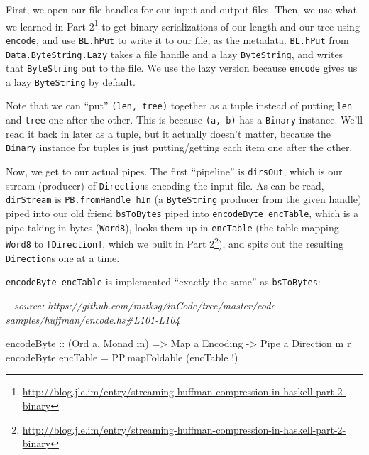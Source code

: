 \documentclass[]{article}
\newenvironment{Shaded}{}{}
\newcommand{\CommentTok}[1]{\textcolor[rgb]{0.38,0.63,0.69}{\textit{#1}}}
\newcommand{\DataTypeTok}[1]{\textcolor[rgb]{0.56,0.13,0.00}{#1}}
\newcommand{\FunctionTok}[1]{\textcolor[rgb]{0.02,0.16,0.49}{#1}}
\newcommand{\NormalTok}[1]{#1}
\newcommand{\OtherTok}[1]{\textcolor[rgb]{0.00,0.44,0.13}{#1}}
\renewcommand{\href}[2]{#2\footnote{\url{#1}}}
\begin{document}
First, we open our file handles for our input and output files. Then, we use
what we learned in
\href{http://blog.jle.im/entry/streaming-huffman-compression-in-haskell-part-2-binary}{Part
2} to get binary serializations of our length and our tree using
\texttt{encode}, and use \texttt{BL.hPut} to write it to our file, as the
metadata. \texttt{BL.hPut} from \texttt{Data.ByteString.Lazy} takes a file
handle and a lazy \texttt{ByteString}, and writes that \texttt{ByteString} out
to the file. We use the lazy version because \texttt{encode} gives us a lazy
\texttt{ByteString} by default.

Note that we can ``put'' \texttt{(len,\ tree)} together as a tuple instead of
putting \texttt{len} and \texttt{tree} one after the other. This is because
\texttt{(a,\ b)} has a \texttt{Binary} instance. We'll read it back in later as
a tuple, but it actually doesn't matter, because the \texttt{Binary} instance
for tuples is just putting/getting each item one after the other.

Now, we get to our actual pipes. The first ``pipeline'' is \texttt{dirsOut},
which is our stream (producer) of \texttt{Direction}s encoding the input file.
As can be read, \texttt{dirStream} is \texttt{PB.fromHandle\ hIn} (a
\texttt{ByteString} producer from the given handle) piped into our old friend
\texttt{bsToBytes} piped into \texttt{encodeByte\ encTable}, which is a pipe
taking in bytes (\texttt{Word8}), looks them up in \texttt{encTable} (the table
mapping \texttt{Word8} to \texttt{{[}Direction{]}}, which we built in
\href{http://blog.jle.im/entry/streaming-huffman-compression-in-haskell-part-2-binary}{Part
2}), and spits out the resulting \texttt{Direction}s one at a time.

\texttt{encodeByte\ encTable} is implemented ``exactly the same'' as
\texttt{bsToBytes}:

\begin{Shaded}
\begin{Highlighting}[]
\CommentTok{-- source: https://github.com/mstksg/inCode/tree/master/code-samples/huffman/encode.hs#L101-L104}

\OtherTok{encodeByte ::}\NormalTok{ (}\DataTypeTok{Ord}\NormalTok{ a, }\DataTypeTok{Monad}\NormalTok{ m)}
           \OtherTok{=>} \DataTypeTok{Map}\NormalTok{ a }\DataTypeTok{Encoding}
           \OtherTok{->} \DataTypeTok{Pipe}\NormalTok{ a }\DataTypeTok{Direction}\NormalTok{ m r}
\NormalTok{encodeByte encTable }\FunctionTok{=}\NormalTok{ PP.mapFoldable (encTable }\FunctionTok{!}\NormalTok{)}
\end{Highlighting}
\end{Shaded}
\end{document}

